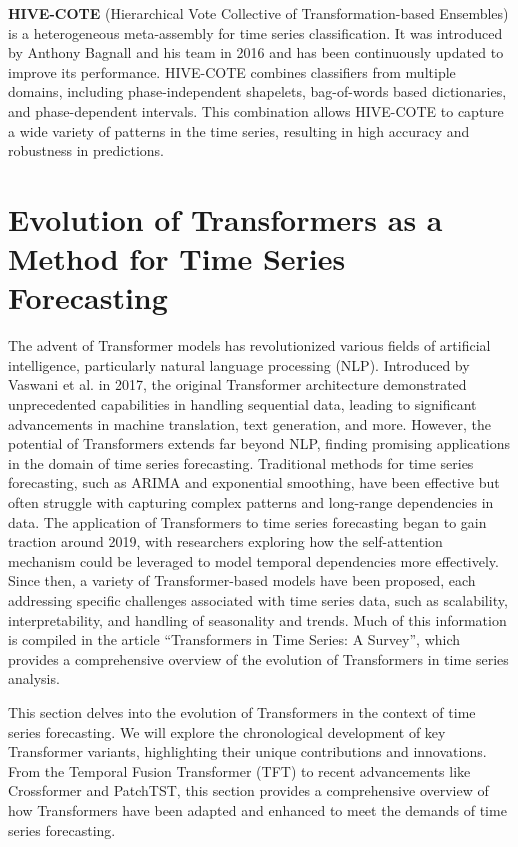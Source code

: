 \textbf{HIVE-COTE} (Hierarchical Vote Collective of Transformation-based Ensembles) is a heterogeneous meta-assembly for time series classification. It was introduced by Anthony Bagnall and his team in 2016 and has been continuously updated to improve its performance. HIVE-COTE combines classifiers from multiple domains, including phase-independent shapelets, bag-of-words based dictionaries, and phase-dependent intervals. This combination allows HIVE-COTE to capture a wide variety of patterns in the time series, resulting in high accuracy and robustness in predictions.




\section{Evolution of Transformers as a Method for Time Series Forecasting}

The advent of Transformer models has revolutionized various fields of artificial intelligence, particularly natural language processing (NLP). Introduced by Vaswani et al. in 2017, the original Transformer architecture demonstrated unprecedented capabilities in handling sequential data, leading to significant advancements in machine translation, text generation, and more. However, the potential of Transformers extends far beyond NLP, finding promising applications in the domain of time series forecasting.
Traditional methods for time series forecasting, such as ARIMA and exponential smoothing, have been effective but often struggle with capturing complex patterns and long-range dependencies in data.
The application of Transformers to time series forecasting began to gain traction around 2019, with researchers exploring how the self-attention mechanism could be leveraged to model temporal dependencies more effectively. Since then, a variety of Transformer-based models have been proposed, each addressing specific challenges associated with time series data, such as scalability, interpretability, and handling of seasonality and trends. Much of this information is compiled in the article “Transformers in Time Series: A Survey”\cite{wen2023transformerstimeseriessurvey}, which provides a comprehensive overview of the evolution of Transformers in time series analysis.

This section delves into the evolution of Transformers in the context of time series forecasting. We will explore the chronological development of key Transformer variants, highlighting their unique contributions and innovations. From the Temporal Fusion Transformer (TFT) to recent advancements like Crossformer and PatchTST, this section provides a comprehensive overview of how Transformers have been adapted and enhanced to meet the demands of time series forecasting.

